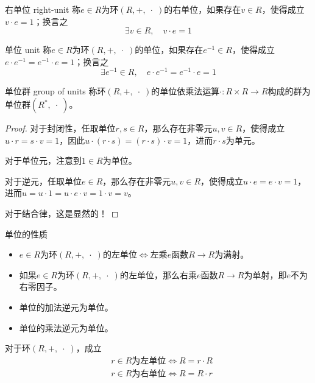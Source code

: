 \begin{definition}{右单位 right-unit}
	称$e\in R$为环$(R,+,\;\cdot\;)$的右单位，如果存在$v\in R$，使得成立$v\cdot e=1$；换言之
	$$
	\exists v\in R,\quad v\cdot e=1
	$$
\end{definition}

\begin{definition}{单位 unit}
	称$e\in R$为环$(R,+,\;\cdot\;)$的单位，如果存在$e^{-1}\in R$，使得成立$e\cdot e^{-1}=e^{-1}\cdot e=1$；换言之
	$$
	\exists e^{-1}\in R,\quad e\cdot e^{-1}=e^{-1}\cdot e=1
	$$
\end{definition}

\begin{definition}{单位群 group of units}
	称环$(R,+,\;\cdot\;)$的单位依乘法运算$\cdot:R\times R\to R$构成的群为单位群$(R^*,\;\cdot\;)$。
\end{definition}

\begin{proof}
	对于封闭性，任取单位$r,s\in R$，那么存在非零元$u,v\in R$，使得成立$u\cdot r=s\cdot v=1$，因此$u\cdot (r\cdot s)=(r\cdot s)\cdot v=1$，进而$r\cdot s$为单元。
	
	对于单位元，注意到$1\in R$为单位。
	
	对于逆元，任取单位$e\in R$，那么存在非零元$u,v\in R$，使得成立$u\cdot e=e\cdot v=1$，进而$u=u\cdot 1=u\cdot e\cdot v=1\cdot v=v$。
	
	对于结合律，这是显然的！
\end{proof}

\begin{definition}{单位的性质}
	\begin{itemize}
		\item $e\in R$为环$(R,+,\;\cdot\;)$的左单位$\iff$左乘$e$函数$R\to R$为满射。
		\item 如果$e\in R$为环$(R,+,\;\cdot\;)$的左单位，那么右乘$e$函数$R\to R$为单射，即$e$不为右零因子。
		\item 单位的加法逆元为单位。
		\item 单位的乘法逆元为单位。
	\end{itemize}
\end{definition}

\begin{proposition}
	对于环$(R,+,\;\cdot\;)$，成立
	\begin{align*}
		&r\in R\text{为左单位}\iff R=r\cdot R\\
		&r\in R\text{为右单位}\iff R=R\cdot r
	\end{align*}
\end{proposition}

